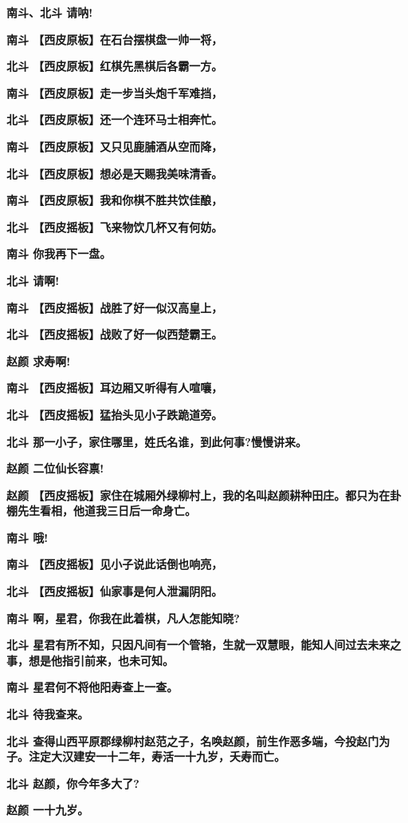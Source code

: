 \textbf{南斗、北斗 请呐!}

\textbf{南斗 【西皮原板】在石台摆棋盘一帅一将，}

\textbf{北斗 【西皮原板】红棋先黑棋后各霸一方。}

\textbf{南斗 【西皮原板】走一步当头炮千军难挡，}

\textbf{北斗 【西皮原板】还一个连环马士相奔忙。}

\textbf{南斗 【西皮原板】又只见鹿脯酒从空而降，}

\textbf{北斗 【西皮原板】想必是天赐我美味清香。}

\textbf{南斗 【西皮原板】我和你棋不胜共饮佳酿，}

\textbf{北斗 【西皮摇板】飞来物饮几杯又有何妨。}

\textbf{南斗 你我再下一盘。}

\textbf{北斗 请啊!}

\textbf{南斗 【西皮摇板】战胜了好一似汉高皇上，}

\textbf{北斗 【西皮摇板】战败了好一似西楚霸王。}

\textbf{赵颜 求寿啊!}

\textbf{南斗 【西皮摇板】耳边厢又听得有人喧嚷，}

\textbf{北斗 【西皮摇板】猛抬头见小子跌跪道旁。}

\textbf{北斗 那一小子，家住哪里，姓氏名谁，到此何事?慢慢讲来。}

\textbf{赵颜 二位仙长容禀!}

\textbf{赵颜
【西皮摇板】家住在城厢外绿柳村上，我的名叫赵颜耕种田庄。都只为在卦棚先生看相，他道我三日后一命身亡。}

\textbf{南斗 哦!}

\textbf{南斗 【西皮摇板】见小子说此话倒也响亮，}

\textbf{北斗 【西皮摇板】仙家事是何人泄漏阴阳。}

\textbf{南斗 啊，星君，你我在此着棋，凡人怎能知晓?}

\textbf{北斗
星君有所不知，只因凡间有一个管辂，生就一双慧眼，能知人间过去未来之事，想是他指引前来，也未可知。}

\textbf{南斗 星君何不将他阳寿查上一查。}

\textbf{北斗 待我查来。}

\textbf{北斗
查得山西平原郡绿柳村赵范之子，名唤赵颜，前生作恶多端，今投赵门为子。注定大汉建安一十二年，寿活一十九岁，夭寿而亡。}

\textbf{北斗 赵颜，你今年多大了?}

\textbf{赵颜 一十九岁。}

